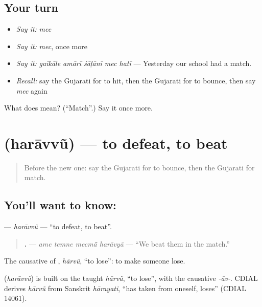 \subsection*{Your turn}
\begin{itemize}
\raggedright
  \item \emph{Say it:} \emph{mec}
  \item \emph{Say it:} \emph{mec}, once more
  \item \emph{Say it:} \emph{gaīkāle amārī śāḷānī mec hatī} — Yesterday our school had a match.
  \item \emph{Recall:} say the Gujarati for to hit, then the Gujarati for to bounce, then say \emph{mec} again
\end{itemize}

\begin{tcolorbox}[breakable,colback=teal!4,colframe=teal!35!black,title={Before you move on}]
What does  mean? (\textquotedblleft{}Match\textquotedblright{}.) Say it once more.
\end{tcolorbox}
\section[\texorpdfstring{\gu{હરાવવું} (harāvvũ)}{હરાવવું (harāvvũ)}]{ (harāvvũ) — to defeat, to beat}

\label{lesson:GU-C259-haravvu}



\begin{quote}
Before the new one: say the Gujarati for to bounce, then the Gujarati for match.
\end{quote}

\subsection*{You'll want to know: }
\textbf{} — \emph{harāvvũ} — \textquotedblleft{}to defeat, to beat\textquotedblright{}.

\begin{quote}
\textbf{   .} — \emph{ame temne mecmā̃ harāvyā} — \textquotedblleft{}We beat them in the match.\textquotedblright{}
\end{quote}

The causative of \textbf{}, \emph{hārvũ}, \textquotedblleft{}to lose\textquotedblright{}: to make someone lose.

\begin{cousinweb}
\textbf{} (\emph{harāvvũ}) is built on the taught \emph{hārvũ}, \textquotedblleft{}to lose\textquotedblright{}, with the causative \emph{-āv-}. CDIAL derives \emph{hārvũ} from Sanskrit \emph{hārayati}, \textquotedblleft{}has taken from oneself, loses\textquotedblright{} (CDIAL 14061).
\end{cousinweb}

